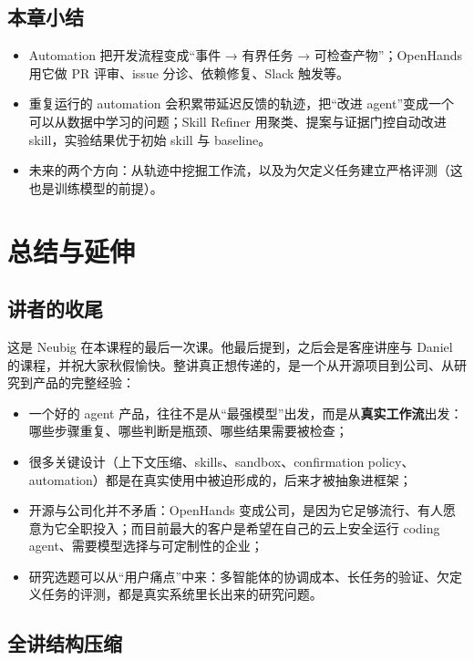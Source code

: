 \documentclass[a4paper]{article}
\begin{document}
\subsection{本章小结}

\begin{itemize}
\item Automation 把开发流程变成“事件 → 有界任务 → 可检查产物”；OpenHands 用它做 PR 评审、issue 分诊、依赖修复、Slack 触发等。
\item 重复运行的 automation 会积累带延迟反馈的轨迹，把“改进 agent”变成一个可以从数据中学习的问题；Skill Refiner 用聚类、提案与证据门控自动改进 skill，实验结果优于初始 skill 与 baseline。
\item 未来的两个方向：从轨迹中挖掘工作流，以及为欠定义任务建立严格评测（这也是训练模型的前提）。
\end{itemize}

\section{总结与延伸}

\subsection{讲者的收尾}

这是 Neubig 在本课程的最后一次课。他最后提到，之后会是客座讲座与 Daniel 的课程，并祝大家秋假愉快。整讲真正想传递的，是一个从开源项目到公司、从研究到产品的完整经验：

\begin{itemize}
\item 一个好的 agent 产品，往往不是从“最强模型”出发，而是从\textbf{真实工作流}出发：哪些步骤重复、哪些判断是瓶颈、哪些结果需要被检查；
\item 很多关键设计（上下文压缩、skills、sandbox、confirmation policy、automation）都是在真实使用中被迫形成的，后来才被抽象进框架；
\item 开源与公司化并不矛盾：OpenHands 变成公司，是因为它足够流行、有人愿意为它全职投入；而目前最大的客户是希望在自己的云上安全运行 coding agent、需要模型选择与可定制性的企业；
\item 研究选题可以从“用户痛点”中来：多智能体的协调成本、长任务的验证、欠定义任务的评测，都是真实系统里长出来的研究问题。
\end{itemize}

\subsection{全讲结构压缩}
\end{document}
